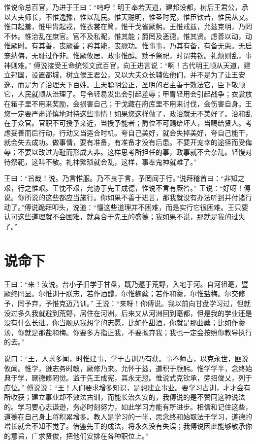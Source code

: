 \documentclass[12pt,UTF8]{ctexbook}
\begin{document}
惟说命总百官，乃进于王曰：“呜呼！明王奉若天道，建邦设都，树后王君公，承以大夫师长，不惟逸豫，惟以乱民。惟天聪明，惟圣时宪，惟臣钦若，惟民从乂。惟口起羞，惟甲胄起戎，惟衣裳在笥，惟干戈省厥躬。王惟戒兹，允兹克明，乃罔不休。惟治乱在庶官。官不及私昵，惟其能；爵罔及恶德，惟其贤。虑善以动，动惟厥时。有其善，丧厥善；矜其能，丧厥功。惟事事，乃其有备，有备无患。无启宠纳侮，无耻过作非。惟厥攸居，政事惟醇。黩予祭祀，时谓弗钦。礼烦则乱，事神则难。”
傅说接受王命统领文武百官，向王进言说：“啊！古代明王顺从天道，建立邦国，设置都城，树立侯王君公，又以大夫众长辅佐他们，并不是为了让王安逸，而是为了治理天下百姓。上天聪明公正，圣明的君主善于效法它，臣下敬顺它，人民就顺从治理了。号令轻易发出会引起羞辱；甲胄轻用会引起战争；衣裳放在箱子里不用来奖励，会损害自己；干戈藏在府库里不用来讨伐，会伤害自身。王您一定要严肃谨慎地对待这些事情！如果您这样做了，政治就无不美好了。治和乱在于众官。官职不可授予亲近，当授予能者；爵位不可赐给坏人，当赐给贤人。考虑妥善而后行动，行动又当适合时机。夸自己美好，就会失掉美好，夸自己能干，就会失去成功。做事情，要有准备，有准备才没有后患。不要开宠幸的途径而受侮辱；不要以改过为耻而形成大非。这样思考所担任的事，政事就不会杂乱。轻慢对待祭祀，这叫不敬。礼神繁琐就会乱，这样，事奉鬼神就难了。”

王曰：“旨哉！说。乃言惟服。乃不良于言，予罔闻于行。”说拜稽首曰：“非知之艰，行之惟艰。王忱不艰，允协于先王成德，惟说不言有厥咎。”
王说：“好呀！傅说。你所说的这些都应当施行。你如果不善于进言，那我就没有办法听到并付诸行动了。”傅说跪拜叩头，说道：“懂这些道理并不困难，而是实行它很困难。王只要认可这些道理就不会困难，就真合于先王的盛德；我如果不说，那就是我的过失了。”

\chapter{说命下}

王曰：“来！汝说。台小子旧学于甘盘，既乃遯于荒野，入宅于河。自河徂亳，暨厥终罔显。尔惟训于朕志，若作酒醴，尔惟麴糵；若作和羹，尔惟盐梅。尔交修予，罔予弃，予惟克迈乃训。”
王说：“来呀！你傅说。我以前向甘盘学习过，但就没过多久我就避到荒野，居住在河洲，后来又从河洲回到亳都，但是我的学业还是没有什么长进。你当顺从我想学的志愿，比如作甜酒，你就是那曲蘖；比如作羹汤，你就是那盐和梅。你要多方指正我，不要抛弃我；我也一定会按照你教导执行的去。”

说曰：“王，人求多闻，时惟建事，学于古训乃有获。事不师古，以克永世，匪说攸闻。惟学，逊志务时敏，厥修乃来。允怀于兹，道积于厥躬。惟学学半，念终始典于学，厥德修罔觉。监于先王成宪，其永无愆。惟说式克钦承，旁招俊乂，列于庶位。”
傅说说：“王！人们要求增多知识，是想建立事业。要学习古训，才才会有所收获；建立事业却不效法古训，而能长治久安的，我傅说的是不赞同这种说法的。学习要心志谦逊，务必时刻努力，如此学习方能有所进步。相信和记住这些，道德在自己身上将积累增多。教人是学习的一半，思念终和始取法于学习，道德的增长就会不知不觉了。借鉴先王的成法，将永久没有失误；我傅说因此能够敬承你的意旨，广求贤俊，把他们安排在各种职位上。”
\end{document}
